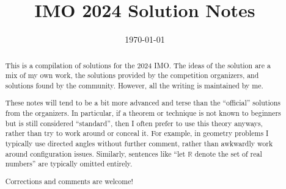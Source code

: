 \documentclass[11pt]{scrartcl}
\title{IMO 2024 Solution Notes}
\date{\today}
\begin{document}
\maketitle

\begin{abstract}
This is a compilation of solutions
for the 2024 IMO.
The ideas of the solution are a mix of my own work,
the solutions provided by the competition organizers,
and solutions found by the community.
However, all the writing is maintained by me.

These notes will tend to be a bit more advanced and terse than the ``official''
solutions from the organizers.
In particular, if a theorem or technique is not known to beginners
but is still considered ``standard'', then I often prefer to
use this theory anyways, rather than try to work around or conceal it.
For example, in geometry problems I typically use directed angles
without further comment, rather than awkwardly work around configuration issues.
Similarly, sentences like ``let $\mathbb{R}$ denote the set of real numbers''
are typically omitted entirely.

Corrections and comments are welcome!
\end{abstract}

\tableofcontents
\newpage

\addtocounter{section}{-1}
\end{document}
